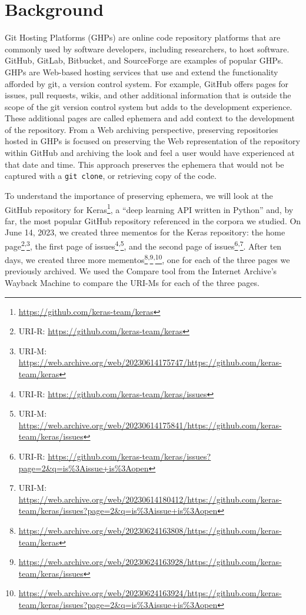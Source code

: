 \chapter{Background}
\label{ch:background}


Git Hosting Platforms (GHPs) are online code repository platforms that are commonly used by software developers, including researchers, to host software. GitHub, GitLab, Bitbucket, and SourceForge are examples of popular GHPs. GHPs are Web-based hosting services that use and extend the functionality afforded by git, a version control system. For example, GitHub offers pages for issues, pull requests, wikis, and other additional information that is outside the scope of the git version control system but adds to the development experience. These additional pages are called ephemera and add context to the development of the repository. From a Web archiving perspective, preserving repositories hosted in GHPs is focused on preserving the Web representation of the repository within GitHub and archiving the look and feel a user would have experienced at that date and time. This approach preserves the ephemera that would not be captured with a \verb|git clone|, or retrieving copy of the code. 

To understand the importance of preserving ephemera, we will look at the GitHub repository for Keras\footnote{\url{https://github.com/keras-team/keras}}, a ``deep learning API written in Python'' and, by far, the most popular GitHub repository referenced in the corpora we studied. On June 14, 2023, we created three mementos for the Keras repository: the home page\footnote{URI-R: \url{https://github.com/keras-team/keras}}\textsuperscript{,}\footnote{URI-M: \url{https://web.archive.org/web/20230614175747/https://github.com/keras-team/keras}}, the first page of issues\footnote{URI-R: \url{https://github.com/keras-team/keras/issues}}\textsuperscript{,}\footnote{URI-M: \url{https://web.archive.org/web/20230614175841/https://github.com/keras-team/keras/issues}}, and the second page of issues\footnote{URI-R: \url{https://github.com/keras-team/keras/issues?page=2\&q=is\%3Aissue+is\%3Aopen}}\textsuperscript{,}\footnote{URI-M: \url{https://web.archive.org/web/20230614180412/https://github.com/keras-team/keras/issues?page=2\&q=is\%3Aissue+is\%3Aopen}}. After ten days, we created three more mementos\footnote{\url{https://web.archive.org/web/20230624163808/https://github.com/keras-team/keras}}\textsuperscript{,}\footnote{\url{https://web.archive.org/web/20230624163928/https://github.com/keras-team/keras/issues}}\textsuperscript{,}\footnote{\url{https://web.archive.org/web/20230624163924/https://github.com/keras-team/keras/issues?page=2\&q=is\%3Aissue+is\%3Aopen}}, one for each of the three pages we previously archived. We used the Compare tool from the Internet Archive's Wayback Machine to compare the URI-Ms for each of the three pages. 


